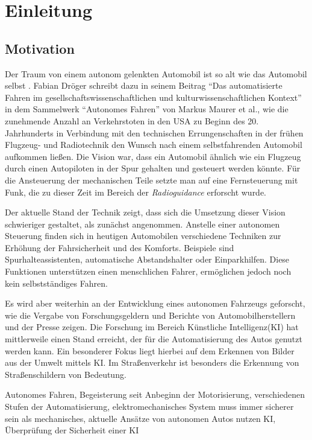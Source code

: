 \chapter{Einleitung}
\label{cha:Einleitung}
\setlength{\epigraphwidth}{4in}

\section{Motivation}
Der Traum von einem autonom gelenkten Automobil ist so alt wie das Automobil selbst \cite{maurer_autonomes_2015}. Fabian Dröger schreibt dazu in seinem Beitrag "`Das automatisierte Fahren im gesellschaftswissenschaftlichen und kulturwissenschaftlichen Kontext"' in dem Sammelwerk "`Autonomes Fahren"' von Markus Maurer et al., wie die zunehmende Anzahl an Verkehrstoten in den USA zu Beginn des 20. Jahrhunderts in Verbindung mit den technischen Errungenschaften in der frühen Flugzeug- und Radiotechnik den Wunsch nach einem selbstfahrenden Automobil aufkommen ließen. Die Vision war, dass ein Automobil ähnlich wie ein Flugzeug durch einen Autopiloten in der Spur gehalten und gesteuert werden könnte. Für die Ansteuerung der mechanischen Teile setzte man auf eine Fernsteuerung mit Funk, die zu dieser Zeit im Bereich der \emph{Radioguidance} erforscht wurde.

Der aktuelle Stand der Technik zeigt, dass sich die Umsetzung dieser Vision schwieriger gestaltet, als zunächst angenommen. Anstelle einer autonomen Steuerung finden sich in heutigen Automobilen verschiedene Techniken zur Erhöhung der Fahrsicherheit und des Komforts. Beispiele sind Spurhalteassistenten, automatische Abstandshalter oder Einparkhilfen. Diese Funktionen unterstützen einen menschlichen Fahrer, ermöglichen jedoch noch kein selbstständiges Fahren.

Es wird aber weiterhin an der Entwicklung eines autonomen Fahrzeugs geforscht, wie die Vergabe von Forschungsgeldern\cite{bmbf-internetredaktion_auto_nodate} und Berichte von Automobilherstellern\cite{bmw_autonomes_nodate} und der Presse\cite{efler_autonomes_2018} zeigen. Die Forschung im Bereich Künstliche Intelligenz(KI) hat mittlerweile einen Stand erreicht, der für die Automatisierung des Autos genutzt werden kann. Ein besonderer Fokus liegt hierbei auf dem Erkennen von Bilder aus der Umwelt mittels KI. Im Straßenverkehr ist besonders die Erkennung von Straßenschildern von Bedeutung. 

 


Autonomes Fahren, Begeisterung seit Anbeginn der Motorisierung, verschiedenen Stufen der Automatisierung, elektromechanisches System muss immer sicherer sein als mechanisches, aktuelle Ansätze von autonomen Autos nutzen KI, Überprüfung der Sicherheit einer KI 

